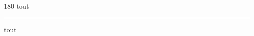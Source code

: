 
\begin{frame}
\begin{center}
\begin{turn}{180}
{\fontsize{2.5cm}{1em}\selectfont tout}
\end{turn}
\vspace{1em}\par  
\hrule
\vspace{1em}\par  
{\fontsize{2.5cm}{1em}\selectfont tout}
\end{center}
\end{frame}
